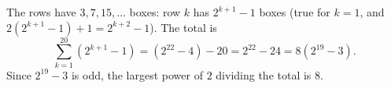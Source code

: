 The rows have $3,7,15,\dots$ boxes: row $k$ has $2^{k+1}-1$ boxes (true for $k=1$, and $2\left(2^{k+1}-1\right)+1=2^{k+2}-1$). The total is
\[\sum_{k=1}^{20}\left(2^{k+1}-1\right)=\left(2^{22}-4\right)-20=2^{22}-24=8\left(2^{19}-3\right).\]
Since $2^{19}-3$ is odd, the largest power of $2$ dividing the total is $\boxed{8}$.
